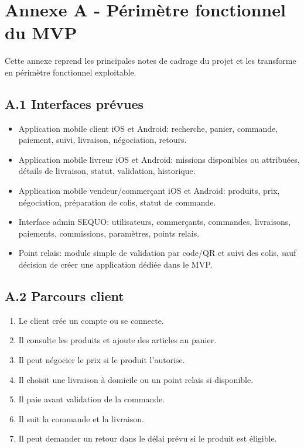 \documentclass[11pt,a4paper]{article}
\begin{document}
\newpage

\section*{Annexe A - Périmètre fonctionnel du MVP}

Cette annexe reprend les principales notes de cadrage du projet et les transforme en périmètre fonctionnel exploitable.

\subsection*{A.1 Interfaces prévues}

\begin{itemize}
    \item Application mobile client iOS et Android: recherche, panier, commande, paiement, suivi, livraison, négociation, retours.
    \item Application mobile livreur iOS et Android: missions disponibles ou attribuées, détails de livraison, statut, validation, historique.
    \item Application mobile vendeur/commerçant iOS et Android: produits, prix, négociation, préparation de colis, statut de commande.
    \item Interface admin SEQUO: utilisateurs, commerçants, commandes, livraisons, paiements, commissions, paramètres, points relais.
    \item Point relais: module simple de validation par code/QR et suivi des colis, sauf décision de créer une application dédiée dans le MVP.
\end{itemize}

\subsection*{A.2 Parcours client}

\begin{enumerate}
    \item Le client crée un compte ou se connecte.
    \item Il consulte les produits et ajoute des articles au panier.
    \item Il peut négocier le prix si le produit l'autorise.
    \item Il choisit une livraison à domicile ou un point relais si disponible.
    \item Il paie avant validation de la commande.
    \item Il suit la commande et la livraison.
    \item Il peut demander un retour dans le délai prévu si le produit est éligible.
\end{enumerate}
\end{document}
